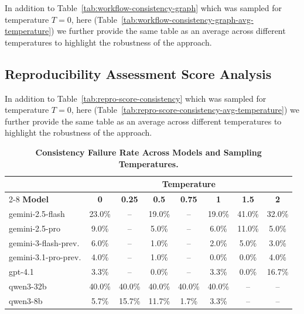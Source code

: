 \documentclass{article}
\begin{document}
In addition to Table~\ref{tab:workflow-consistency-graph} which was sampled for temperature $T=0$, here (Table~\ref{tab:workflow-consistency-graph-avg-temperature}) we further provide the same table as an average across different temperatures to highlight the robustness of the approach.

\subsection{Reproducibility Assessment Score Analysis}

In addition to Table~\ref{tab:repro-score-consistency} which was sampled for temperature $T=0$, here (Table~\ref{tab:repro-score-consistency-avg-temperature}) we further provide the same table as an average across different temperatures to highlight the robustness of the approach.

\clearpage

\begin{table}[!h]
\centering
\caption{\textbf{Consistency Failure Rate Across Models and Sampling Temperatures.}}
\label{tab:consistency-failure-rate}
\begin{tabular}{lccccccc}
\toprule
 & \multicolumn{7}{c}{\textbf{Temperature}} \\
\cmidrule(lr){2-8}
\textbf{Model} & \textbf{0} & \textbf{0.25} & \textbf{0.5} & \textbf{0.75} & \textbf{1} & \textbf{1.5} & \textbf{2} \\
\midrule
gemini-2.5-flash        & 23.0\% & -- & 19.0\% & -- & 19.0\% & 41.0\% & 32.0\% \\
gemini-2.5-pro          & 9.0\%  & -- & 5.0\%  & -- & 6.0\%  & 11.0\% & 5.0\% \\
gemini-3-flash-prev.    & 6.0\%  & -- & 1.0\%  & -- & 2.0\%  & 5.0\%  & 3.0\% \\
gemini-3.1-pro-prev.    & 4.0\%  & -- & 1.0\%  & -- & 0.0\%  & 0.0\%  & 4.0\% \\
gpt-4.1                 & 3.3\%  & -- & 0.0\%  & -- & 3.3\%  & 0.0\%  & 16.7\% \\
qwen3-32b               & 40.0\% & 40.0\% & 40.0\% & 40.0\% & 40.0\% & -- & -- \\
qwen3-8b                & 5.7\%  & 15.7\% & 11.7\% & 1.7\%  & 3.3\%  & -- & -- \\
\bottomrule
\end{tabular}
\end{table}
\end{document}
